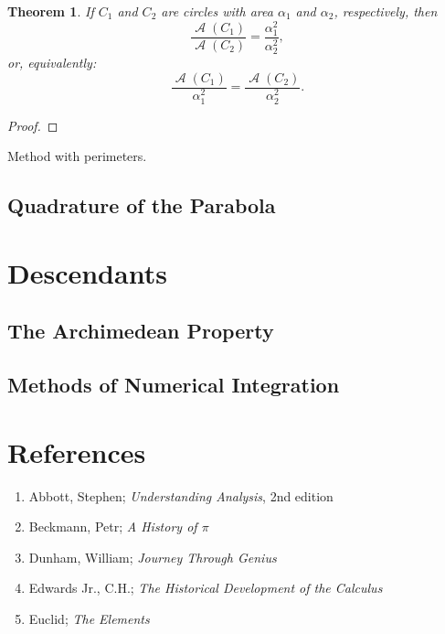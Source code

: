 \documentclass[letterpaper, 12pt]{amsart}
\DeclareMathOperator{\A}{\mathcal{A}}
\newtheorem{thm}{Theorem}[section]
\theoremstyle{definition}  %
\begin{document}
		\begin{thm}
		If $C_{1}$ and $C_{2}$ are circles with area $\alpha_{1}$ and $\alpha_{2}$, respectively, then $$\frac{\A(C_{1})}{\A(C_{2})} = \frac{\alpha_{1}^{2}}{\alpha_{2}^{2}},$$ or, equivalently: $$\frac{\A(C_{1})}{\alpha_{1}^{2}} = \frac{\A(C_{2})}{\alpha_{2}^{2}}.$$
		\end{thm}
		\begin{proof}
		\end{proof}

		Method with perimeters.

		\subsection{Quadrature of the Parabola}
		\label{sub:quadrature_of_the_parabola}

	\section{Descendants}
	\label{sec:descendants}
		\subsection{The Archimedean Property}
		\label{sub:the_archimedean_property}

		\subsection{Methods of Numerical Integration}
		\label{sub:methods_of_numerical_integration}
	\newpage

	\appendix

	\section{References}
	\label{sec:references}
	\begin{enumerate}
		\item Abbott, Stephen; \textit{Understanding Analysis}, 2nd edition
		\item Beckmann, Petr; \textit{A History of $\pi$}
		\item Dunham, William; \textit{Journey Through Genius}
		\item Edwards Jr., C.H.; \textit{The Historical Development of the Calculus}
		\item Euclid; \textit{The Elements}
	\end{enumerate}
	\newpage
\end{document}
